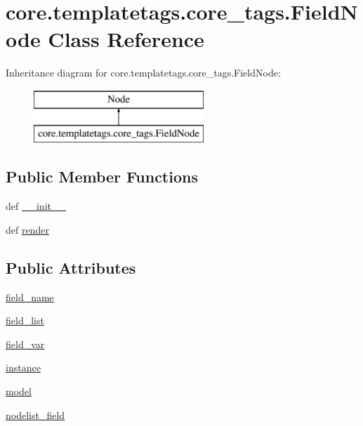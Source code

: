 \hypertarget{classcore_1_1templatetags_1_1core__tags_1_1FieldNode}{\section{core.\-templatetags.\-core\-\_\-tags.\-Field\-Node Class Reference}
\label{classcore_1_1templatetags_1_1core__tags_1_1FieldNode}
}
Inheritance diagram for core.\-templatetags.\-core\-\_\-tags.\-Field\-Node\-:\begin{figure}[H]
\begin{center}
\leavevmode
\includegraphics[height=2.000000cm]{classcore_1_1templatetags_1_1core__tags_1_1FieldNode}
\end{center}
\end{figure}
\subsection*{Public Member Functions}
\begin{DoxyCompactItemize}
\item 
def \hyperlink{classcore_1_1templatetags_1_1core__tags_1_1FieldNode_accb84d2afd89f30abe0e6916084e6b41}{\-\_\-\-\_\-init\-\_\-\-\_\-}
\item 
def \hyperlink{classcore_1_1templatetags_1_1core__tags_1_1FieldNode_ad1759f96de621b72fd8295f02b36ffe7}{render}
\end{DoxyCompactItemize}
\subsection*{Public Attributes}
\begin{DoxyCompactItemize}
\item 
\hyperlink{classcore_1_1templatetags_1_1core__tags_1_1FieldNode_a9d062381a044b5570b7e275e0ec7bc20}{field\-\_\-name}
\item 
\hyperlink{classcore_1_1templatetags_1_1core__tags_1_1FieldNode_ae7faeeff3066a619a964e5b34dbe398a}{field\-\_\-list}
\item 
\hyperlink{classcore_1_1templatetags_1_1core__tags_1_1FieldNode_aaf42c14788451f7dbe4a0cb92c4ddcb3}{field\-\_\-var}
\item 
\hyperlink{classcore_1_1templatetags_1_1core__tags_1_1FieldNode_a3d16b5fe648ccbdb38844010df869091}{instance}
\item 
\hyperlink{classcore_1_1templatetags_1_1core__tags_1_1FieldNode_aa5091f4c8032080baf130279fdcdf63d}{model}
\item 
\hyperlink{classcore_1_1templatetags_1_1core__tags_1_1FieldNode_a7e8856dc5073834638532b0fb9bc7971}{nodelist\-\_\-field}
\end{DoxyCompactItemize}


